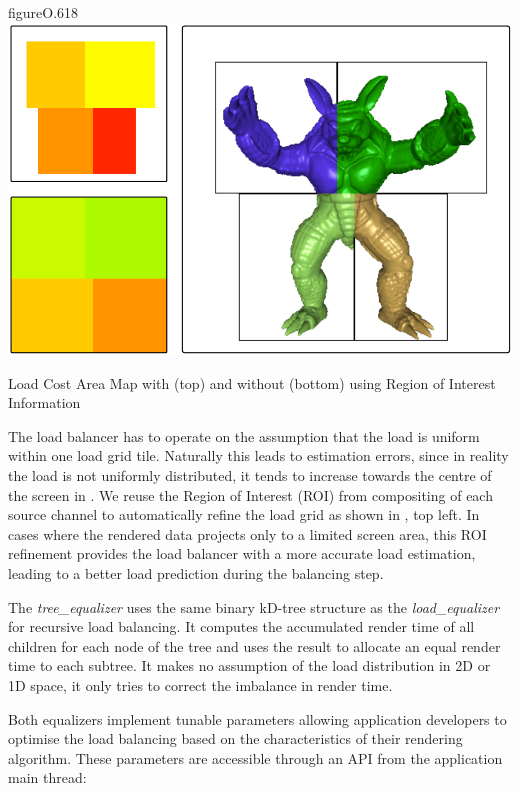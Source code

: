 \begin{wrapfloat}{figure}{O}{.618\textwidth}
  \includegraphics[width=.618\textwidth]{images/roi}
  \caption{Load Cost Area Map with (top) and without (bottom) using Region of Interest Information}
  \label{fROI}
\end{wrapfloat}

The load balancer has to operate on the assumption that the load is uniform
within one load grid tile. Naturally this leads to estimation errors, since in
reality the load is not uniformly distributed, it tends to increase towards the
centre of the screen in . We reuse the Region of Interest (ROI) from
compositing of each source channel to automatically refine the load grid as
shown in , top left. In cases where the rendered data projects only
to a limited screen area, this ROI refinement provides the load balancer with a
more accurate load estimation, leading to a better load prediction during the
balancing step.

The {\em tree\_equalizer} uses the same binary kD-tree structure as the
{\em load\_equalizer} for recursive load balancing. It computes the
accumulated render time of all children for each node of the tree and uses
the result to allocate an equal render time to each subtree. It makes no assumption
of the load distribution in 2D or 1D space, it only tries to correct the
imbalance in render time.

Both equalizers implement tunable parameters allowing application developers
to optimise the load balancing based on the characteristics of their rendering
algorithm. These parameters are accessible through an API from the application
main thread:


